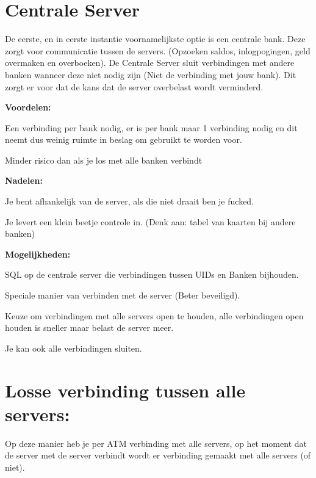 \documentclass{article}
\begin{document}
\section{Centrale Server}
De eerste, en in eerste instantie voornamelijkste optie is een centrale bank.
Deze zorgt voor communicatie tussen de servers.
(Opzoeken saldos, inlogpogingen, geld overmaken en overboeken).
De Centrale Server sluit verbindingen met andere banken wanneer deze niet nodig zijn (Niet de verbinding met jouw bank).
Dit zorgt er voor dat de kans dat de server overbelast wordt verminderd.

\vspace{5mm}
\textbf{Voordelen:}
\begin{description}
\item Een verbinding per bank nodig, er is per bank maar 1 verbinding nodig en dit neemt dus weinig ruimte in beslag om gebruikt te worden voor.
\item Minder risico dan als je los met alle banken verbindt
\end{description}

\vspace{5mm}
\textbf{Nadelen:}
\begin{description}
\item Je bent afhankelijk van de server, als die niet draait ben je fucked.
\item Je levert een klein beetje controle in. (Denk aan: tabel van kaarten bij andere banken)
\end{description}

\vspace{5mm}
\textbf{Mogelijkheden:}
\begin{description}
\item SQL op de centrale server die verbindingen tussen UIDs en Banken bijhouden.
\item Speciale manier van verbinden met de server (Beter beveiligd).
\item Keuze om verbindingen met alle servers open te houden, alle verbindingen open houden is sneller maar belast de server meer.
\item Je kan ook alle verbindingen sluiten.
\end{description}

\clearpage
\newpage

\section{Losse verbinding tussen alle servers:}
Op deze manier heb je per ATM verbinding met alle servers,
op het moment dat de server met de server verbindt wordt er verbinding gemaakt met alle servers (of niet).
\end{document}
